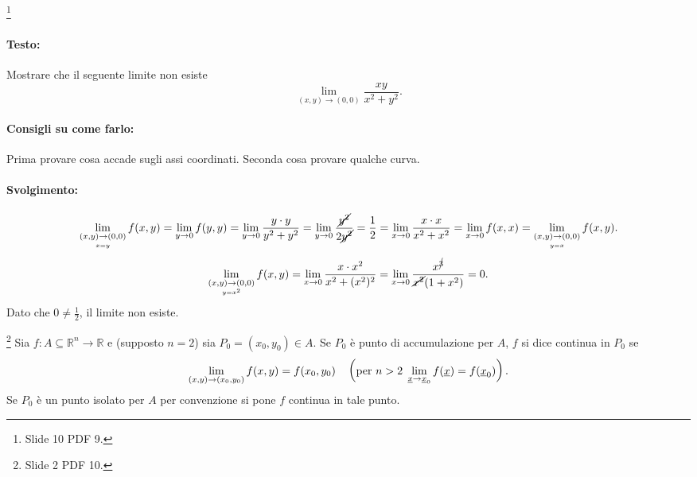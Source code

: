 \begin{exercise}\label{exercise:limite_non_esiste_casa}\footnote{Slide 10 PDF 9.}
    \paragraph{Testo:} Mostrare che il seguente limite non esiste
    \begin{equation*}
        \lim\limits_{(x,y)\rightarrow(0,0)}\frac{xy}{x^2+y^2}.
    \end{equation*}
    \paragraph{Consigli su come farlo:} Prima provare cosa accade sugli assi coordinati. Seconda cosa provare qualche curva.
    \paragraph{Svolgimento:}
    \begin{equation*}
        \lim\limits_{\underset{x=y}{(x,y)\rightarrow(0,0)}}f(x,y)=\lim\limits_{y\rightarrow 0}f(y,y)=\lim\limits_{y\rightarrow 0}\frac{y\cdot y}{y^2+y^2}=\lim\limits_{y\rightarrow 0}\frac{\cancel{y^2}}{2\cancel{y^2}}=\frac{1}{2}=\lim\limits_{x\rightarrow 0}\frac{x\cdot x}{x^2+x^2}=\lim\limits_{x\rightarrow 0}f(x,x)=\lim\limits_{\underset{y=x}{(x,y)\rightarrow(0,0)}}f(x,y).
    \end{equation*}
    \begin{equation*}
       \lim\limits_{\underset{y=x^2}{(x,y)\rightarrow(0,0)}}f(x,y)=\lim\limits_{x\rightarrow 0}\frac{x\cdot x^2}{x^2+(x^2)^2}=\lim\limits_{x\rightarrow 0}\frac{x^{\cancel{3}}}{\cancel{x^2}(1+x^2)}=0.
    \end{equation*}
    Dato che $0\neq \frac{1}{2}$, il limite non esiste.
\end{exercise}

\begin{definition}\footnote{Slide 2 PDF 10.}\label{def:continuita_funzione_n_variabili}
    Sia $f\colon A\subseteq\mathbb R^n\rightarrow\mathbb R$ e (supposto $n=2$) sia $P_0=(x_0,y_0)\in A$. Se $P_0$ è punto di accumulazione per $A$, $f$ si dice continua in $P_0$ se
    \begin{equation}\label{eq:limite_continuita}
        \lim\limits_{(x,y)\rightarrow(x_0,y_0)}f(x,y)=f(x_0,y_0)\quad \left(\text{per } n>2\; \lim\limits_{\uline x\rightarrow\uline x_0}f(\uline x)=f(\uline x_0)\right).
    \end{equation}
    Se $P_0$ è un punto isolato per $A$ per convenzione si pone $f$ continua in tale punto.
\end{definition}

